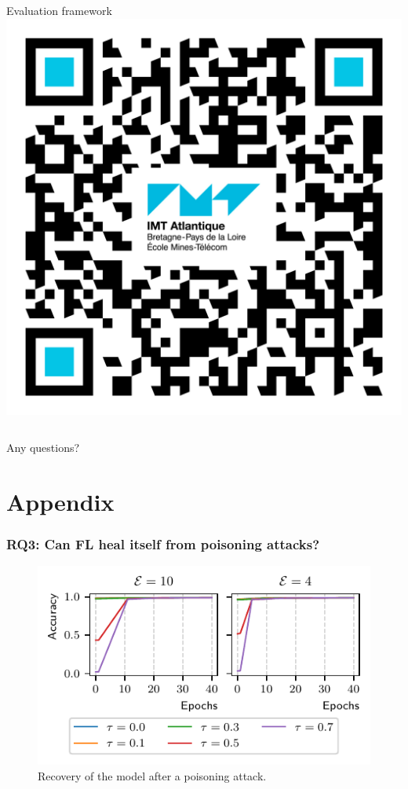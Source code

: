 \documentclass[color,t,presentation,english,aspectratio=169]{beamer}
\begin{document}
\begin{frame}
\begin{columns}
\begin{column}{.25\textwidth}
			\centering
			\small Evaluation framework\\
			\includegraphics[width=.8\linewidth]{figures/qr-eiffel.png}
		\end{column}
	\end{columns}
	\vspace{4ex}
	\centering\Large Any questions?


\end{frame}

\section*{Appendix}

\begin{frame}
	\frametitle{RQ3: Can FL heal itself from poisoning attacks?}
	\begin{figure}
		\centering
		\includegraphics[width=.5\textwidth]{figures/redemption.pdf}
		\caption{Recovery of the model after a poisoning attack.}
	\end{figure}
\end{frame}
\end{document}
